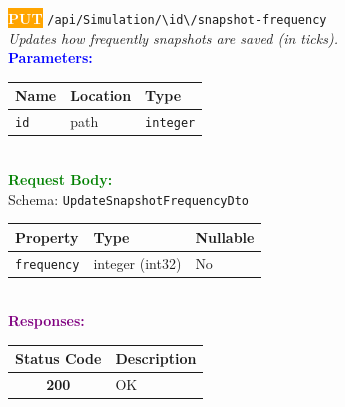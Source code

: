 \begin{tcolorbox}[
    colback=orange!5,
    colframe=orange,
    arc=2mm,
    boxrule=1pt,
    left=5pt,
    right=5pt,
    top=5pt,
    bottom=5pt
]
\noindent\colorbox{orange}{\textcolor{white}{\textbf{PUT}}} 
\texttt{\large /api/Simulation/\textbackslash{}{id\textbackslash{}}/snapshot-frequency}\\[0.3em]
\textit{Updates how frequently snapshots are saved (in ticks).}\\[0.3em]
\vspace{0.3em}
\textbf{\textcolor{blue}{Parameters:}}\\[0.2em]
\begin{tabular}{|l|l|l|}
\hline
\rowcolor{gray!20}
\textbf{Name} & \textbf{Location} & \textbf{Type} \\ \hline
\texttt{id} & path & \texttt{integer} \\ \hline
\end{tabular}\\[0.5em]
\vspace{0.3em}
\textbf{\textcolor{green}{Request Body:}}\\[0.2em]
Schema: \texttt{UpdateSnapshotFrequencyDto}\\[0.3em]
\begin{tabular}{|l|l|l|}
\hline
\rowcolor{green!10}
\textbf{Property} & \textbf{Type} & \textbf{Nullable} \\ \hline
\texttt{frequency} & integer (int32) & No \\ \hline
\end{tabular}\\[0.5em]
\vspace{0.3em}
\textbf{\textcolor{purple}{Responses:}}\\[0.2em]
\begin{tabular}{|c|p{10cm}|}
\hline
\rowcolor{gray!20}
\textbf{Status Code} & \textbf{Description} \\ \hline
\colorbox{green!20}{\textbf{200}} & OK \\ \hline
\end{tabular}
\end{tcolorbox}
\vspace{0.5em}

